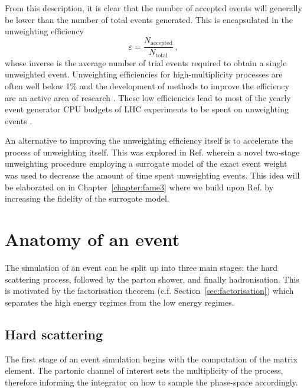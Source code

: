 \documentclass[main.tex]{subfiles}
\begin{document}
    From this description, it is clear that the number
    of accepted events will generally be lower than
    the number of total events generated. This is encapsulated
    in the unweighting efficiency
    \begin{equation}\label{eqn:unweighting_efficiency}
        \varepsilon = \dfrac{N_{\mathrm{accepted}}}{N_{\mathrm{total}}} \, ,
    \end{equation}
    whose inverse is the average number of trial
    events required to obtain a single unweighted event.
    Unweighting efficiencies for high-multiplicity processes
    are often well below 1\% \cite{Hoche:2019flt,Gao:2020zvv} and the development
    of methods to improve the efficiency are an active area of research
    \cite{Jadach:1999sf,Jadach:2002kn}.
    These low efficiencies lead to most of the
    yearly event generator CPU budgets of LHC experiments to be spent on
    unweighting events \cite{HSFPhysicsEventGeneratorWG:2020gxw}.

    An alternative to improving the unweighting efficiency
    itself is to accelerate the process of unweighting itself. This
    was explored in Ref. \cite{Danziger:2021eeg} wherein a
    novel two-stage unweighting procedure employing a surrogate
    model of the exact event weight was used to decrease the amount of
    time spent unweighting events. This idea will be elaborated on
    in Chapter~\ref{chapter:fame3} where we build upon
    Ref. \cite{Danziger:2021eeg} by increasing the fidelity of
    the surrogate model.

    \section{Anatomy of an event}\label{sec:anatomy_event}
    The simulation of an event can be split up into three
    main stages: the hard scattering process, followed by
    the parton shower, and finally hadronisation.
    This is motivated by the factorisation theorem (c.f. Section~\ref{sec:factorisation})
    which separates the high energy regimes from the low
    energy regimes.

    \subsection*{Hard scattering}\label{sec:me_generators}
    The first stage of an event simulation begins with
    the computation of the matrix element. The partonic
    channel of interest sets the multiplicity of the process,
    therefore informing the integrator on how to sample the phase-space
    accordingly.
\end{document}
